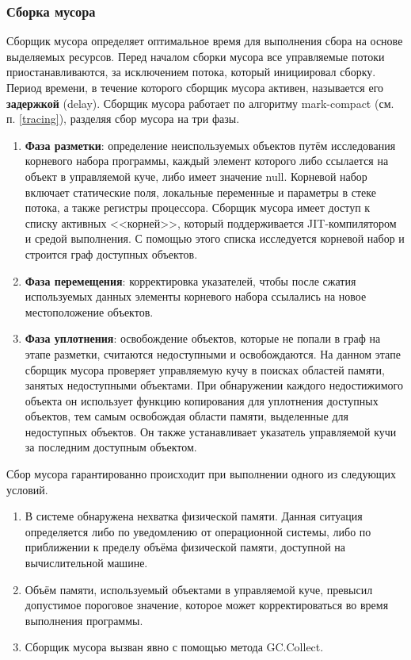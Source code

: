 \subsubsection*{Сборка мусора}

Сборщик мусора определяет оптимальное время для выполнения сбора на основе выделяемых ресурсов. Перед началом сборки мусора все управляемые потоки приостанавливаются, за исключением потока, который инициировал сборку. Период времени, в течение которого сборщик мусора активен, называется его \textbf{задержкой} (delay). Сборщик мусора работает по алгоритму mark-compact (см. п. \ref{tracing}), разделяя сбор мусора на три фазы.~\cite{dotnet_gc}

\begin{enumerate}[label*=\arabic*.]
	\item \textbf{Фаза разметки}: определение неиспользуемых объектов путём исследования корневого набора программы, каждый элемент которого либо ссылается на объект в управляемой куче, либо имеет значение null. Корневой набор включает статические поля, локальные переменные и параметры в стеке потока, а также регистры процессора. Сборщик мусора имеет доступ к списку активных <<корней>>, который поддерживается JIT-компилятором и средой выполнения. С помощью этого списка исследуется корневой набор и строится граф доступных объектов.
	\item \textbf{Фаза перемещения}: корректировка указателей, чтобы после сжатия используемых данных элементы корневого набора ссылались на новое местоположение объектов.
	\item \textbf{Фаза уплотнения}: освобождение объектов, которые не попали в граф на этапе разметки, считаются недоступными и освобождаются. На данном этапе сборщик мусора проверяет управляемую кучу в поисках областей памяти, занятых недоступными объектами. При обнаружении каждого недостижимого объекта он использует функцию копирования для уплотнения доступных объектов, тем самым освобождая области памяти, выделенные для недоступных объектов. Он также устанавливает указатель управляемой кучи за последним доступным объектом. 
\end{enumerate}

Сбор мусора гарантированно происходит при выполнении одного из следующих условий.~\cite{dotnet_gc}

\begin{enumerate}[label*=\arabic*.]
	\item В системе обнаружена нехватка физической памяти. Данная ситуация определяется либо по уведомлению от операционной системы, либо по приближении к пределу объёма физической памяти, доступной на вычислительной машине.
	\item Объём памяти, используемый объектами в управляемой куче, превысил допустимое пороговое значение, которое может корректироваться во время выполнения программы.
	\item Сборщик мусора вызван явно с помощью метода GC.Collect.
\end{enumerate}

